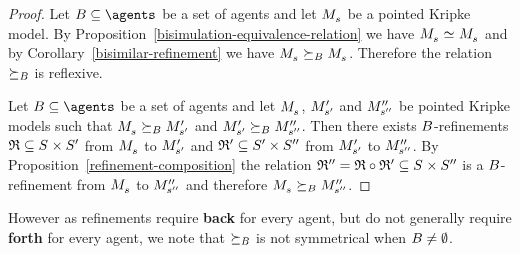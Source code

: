 \begin{proof}
Let $\agentsB \subseteq \agents$ be a set of agents and let $\kPModel{\kStateS}$ be a pointed Kripke model.
By Proposition~\ref{bisimulation-equivalence-relation} we have $\kPModel{\kStateS} \bisimilar \kPModel{\kStateS}$ and by Corollary~\ref{bisimilar-refinement} we have $\kPModel{\kStateS} \simulatesBs \kPModel{\kStateS}$.
Therefore the relation $\succeq_{B}$ is reflexive.

Let $\agentsB \subseteq \agents$ be a set of agents and let $\kPModel{\kStateS}$, ${M^{\prime}_{{s}^{\prime}}}$ and ${M^{\prime\prime}_{{s}^{\prime\prime}}}$ be pointed Kripke models such that $\kPModel{\kStateS} \simulatesBs \kPModelP{\kStateSP}$ and ${M^{\prime}_{{s}^{\prime}}} \succeq_{B} {M^{\prime\prime}_{{s}^{\prime\prime}}}$.
Then there exists $B$-refinements $\refinement \subseteq \kStates \times \kStatesP$ from $\kPModel{\kStateS}$ to ${M^{\prime}_{{s}^{\prime}}}$ and $\mathfrak{R}' \subseteq {S^{\prime}} \times {S^{\prime\prime}}$ from ${M^{\prime}_{{s}^{\prime}}}$ to ${M^{\prime\prime}_{{s}^{\prime\prime}}}$.
By Proposition~\ref{refinement-composition} the relation $\refinement'' = \refinement \circ \refinement' \subseteq \kStates \times \kStatesPP$ is a $B$-refinement from $\kPModel{\kStateS}$ to ${M^{\prime\prime}_{{s}^{\prime\prime}}}$ and therefore $\kPModel{\kStateS} \simulatesBs \kPModelPP{\kStateSPP}$.
\end{proof}

However as refinements require {\bf back} for every agent, but do not generally require {\bf forth} for every agent, we note that $\succeq_{B}$ is not symmetrical when $B \neq \emptyset$.

